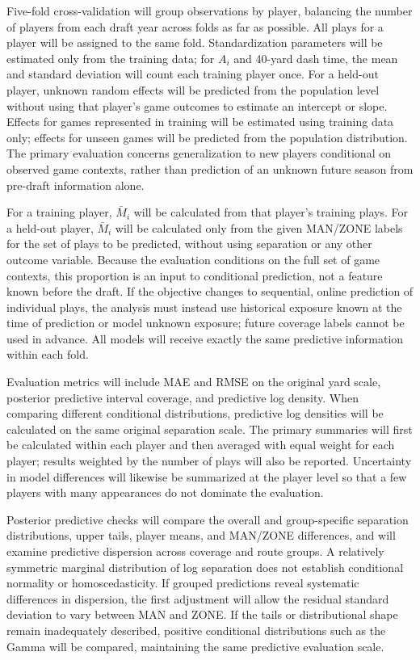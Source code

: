 \documentclass[a4paper,11pt]{article}
\begin{document}
Five-fold cross-validation will group observations by player, balancing the number of players from each draft year across folds as far as possible. All plays for a player will be assigned to the same fold. Standardization parameters will be estimated only from the training data; for $A_i$ and 40-yard dash time, the mean and standard deviation will count each training player once. For a held-out player, unknown random effects will be predicted from the population level without using that player's game outcomes to estimate an intercept or slope. Effects for games represented in training will be estimated using training data only; effects for unseen games will be predicted from the population distribution. The primary evaluation concerns generalization to new players conditional on observed game contexts, rather than prediction of an unknown future season from pre-draft information alone.\cite{loo}

For a training player, $\bar M_i$ will be calculated from that player's training plays. For a held-out player, $\bar M_i$ will be calculated only from the given MAN/ZONE labels for the set of plays to be predicted, without using separation or any other outcome variable. Because the evaluation conditions on the full set of game contexts, this proportion is an input to conditional prediction, not a feature known before the draft. If the objective changes to sequential, online prediction of individual plays, the analysis must instead use historical exposure known at the time of prediction or model unknown exposure; future coverage labels cannot be used in advance. All models will receive exactly the same predictive information within each fold.

Evaluation metrics will include MAE and RMSE on the original yard scale, posterior predictive interval coverage, and predictive log density. When comparing different conditional distributions, predictive log densities will be calculated on the same original separation scale. The primary summaries will first be calculated within each player and then averaged with equal weight for each player; results weighted by the number of plays will also be reported. Uncertainty in model differences will likewise be summarized at the player level so that a few players with many appearances do not dominate the evaluation.

Posterior predictive checks will compare the overall and group-specific separation distributions, upper tails, player means, and MAN/ZONE differences, and will examine predictive dispersion across coverage and route groups. A relatively symmetric marginal distribution of log separation does not establish conditional normality or homoscedasticity. If grouped predictions reveal systematic differences in dispersion, the first adjustment will allow the residual standard deviation to vary between MAN and ZONE. If the tails or distributional shape remain inadequately described, positive conditional distributions such as the Gamma will be compared, maintaining the same predictive evaluation scale.\cite{stanppc}
\end{document}

